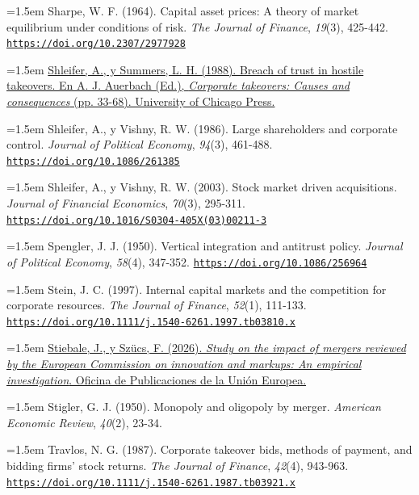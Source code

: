 \documentclass[10pt,a4paper]{article}
\begin{document}
\noindent\hangindent=1.5em Sharpe, W. F. (1964). Capital asset prices: A theory of market equilibrium under conditions of risk. \textit{The Journal of Finance}, \textit{19}(3), 425-442. \href{https://doi.org/10.2307/2977928}{\nolinkurl{https://doi.org/10.2307/2977928}}

\noindent\hangindent=1.5em \href{https://www.nber.org/chapters/c2052.pdf}{Shleifer, A., y Summers, L. H. (1988). Breach of trust in hostile takeovers. En A. J. Auerbach (Ed.), \textit{Corporate takeovers: Causes and consequences} (pp. 33-68). University of Chicago Press.}

\noindent\hangindent=1.5em Shleifer, A., y Vishny, R. W. (1986). Large shareholders and corporate control. \textit{Journal of Political Economy}, \textit{94}(3), 461-488. \href{https://doi.org/10.1086/261385}{\nolinkurl{https://doi.org/10.1086/261385}}

\noindent\hangindent=1.5em Shleifer, A., y Vishny, R. W. (2003). Stock market driven acquisitions. \textit{Journal of Financial Economics}, \textit{70}(3), 295-311. \href{https://doi.org/10.1016/S0304-405X(03)00211-3}{\nolinkurl{https://doi.org/10.1016/S0304-405X(03)00211-3}}

\noindent\hangindent=1.5em Spengler, J. J. (1950). Vertical integration and antitrust policy. \textit{Journal of Political Economy}, \textit{58}(4), 347-352. \href{https://doi.org/10.1086/256964}{\nolinkurl{https://doi.org/10.1086/256964}}

\noindent\hangindent=1.5em Stein, J. C. (1997). Internal capital markets and the competition for corporate resources. \textit{The Journal of Finance}, \textit{52}(1), 111-133. \href{https://doi.org/10.1111/j.1540-6261.1997.tb03810.x}{\nolinkurl{https://doi.org/10.1111/j.1540-6261.1997.tb03810.x}}

\noindent\hangindent=1.5em \href{https://competition-policy.ec.europa.eu/document/download/dc48d9d4-8151-454c-9bfc-c69af2c96e86_en?filename=kd0126016enn_Impact_mergers_innovation_and_markups.pdf}{Stiebale, J., y Szücs, F. (2026). \textit{Study on the impact of mergers reviewed by the European Commission on innovation and markups: An empirical investigation}. Oficina de Publicaciones de la Unión Europea.}

\noindent\hangindent=1.5em Stigler, G. J. (1950). Monopoly and oligopoly by merger. \textit{American Economic Review}, \textit{40}(2), 23-34.

\noindent\hangindent=1.5em Travlos, N. G. (1987). Corporate takeover bids, methods of payment, and bidding firms' stock returns. \textit{The Journal of Finance}, \textit{42}(4), 943-963. \href{https://doi.org/10.1111/j.1540-6261.1987.tb03921.x}{\nolinkurl{https://doi.org/10.1111/j.1540-6261.1987.tb03921.x}}
\end{document}
